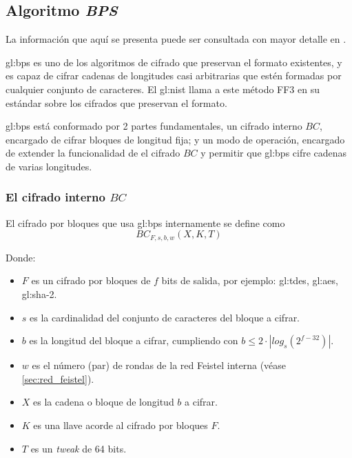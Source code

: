 %
%

\subsection{Algoritmo \textit{BPS}}
\label{sec:bps}

La información que aquí se presenta puede ser consultada con mayor detalle en
\cite{bps}.

\Gls{gl:bps} es uno de los algoritmos de cifrado que preservan el formato
existentes, y es capaz de cifrar cadenas de longitudes casi arbitrarias que
estén formadas por cualquier conjunto de caracteres. El \gls{gl:nist} llama a
este método FF3 en su estándar sobre los cifrados que preservan el
formato\cite{nist_fpe}.

\Gls{gl:bps} está conformado por 2 partes fundamentales, un cifrado interno
$BC$, encargado de cifrar bloques de longitud fija; y un modo de operación,
encargado de extender la funcionalidad de el cifrado $BC$ y permitir que
\gls{gl:bps} cifre cadenas de varias longitudes.


\subsubsection{El cifrado interno $BC$}
\label{sec:bps_cifrador_interno_bc}


El cifrado por bloques que usa \gls{gl:bps} internamente se define como
\begin{equation}
  BC_{F,s,b,w}(X,K,T)
\end{equation}

Donde:
\begin{itemize}
  \item $F$ es un cifrado por bloques de $f$ bits de salida,
    por ejemplo: \gls{gl:tdes}, \gls{gl:aes}, \gls{gl:sha}-2.
  \item $s$ es la cardinalidad del conjunto de caracteres del bloque a cifrar.
  \item $b$ es la longitud del bloque a cifrar,
    cumpliendo con $b \leq 2 \cdot |log_s(2^{f-32})|$.
  \item $w$ es el número (par) de rondas de la red Feistel interna
    (véase \ref{sec:red_feistel}).
  \item $X$ es la cadena o bloque de longitud $b$ a cifrar.
  \item $K$ es una llave acorde al cifrado por bloques $F$.
  \item $T$ es un \textit{tweak} de 64 bits.
\end{itemize}

